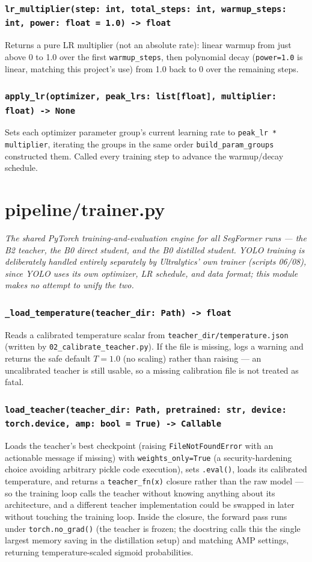 \documentclass[11pt]{article}
\newcommand{\role}[1]{\par\noindent\textit{#1}\par\vspace{0.5em}}
\newcommand{\func}[1]{\subsubsection*{\texttt{#1}}}
\begin{document}
\func{lr\_multiplier(step: int, total\_steps: int, warmup\_steps: int, power: float = 1.0) -> float}
Returns a pure LR multiplier (not an absolute rate): linear warmup from just
above 0 to 1.0 over the first \texttt{warmup\_steps}, then polynomial decay
(\texttt{power=1.0} is linear, matching this project's use) from 1.0 back to 0
over the remaining steps.

\func{apply\_lr(optimizer, peak\_lrs: list[float], multiplier: float) -> None}
Sets each optimizer parameter group's current learning rate to
\texttt{peak\_lr * multiplier}, iterating the groups in the same order
\texttt{build\_param\_groups} constructed them. Called every training step to
advance the warmup/decay schedule.

\newpage
\section{pipeline/trainer.py}
\role{The shared PyTorch training-and-evaluation engine for all SegFormer runs
--- the B2 teacher, the B0 direct student, and the B0 distilled student. YOLO
training is deliberately handled entirely separately by Ultralytics' own
trainer (scripts 06/08), since YOLO uses its own optimizer, LR schedule, and
data format; this module makes no attempt to unify the two.}

\func{\_load\_temperature(teacher\_dir: Path) -> float}
Reads a calibrated temperature scalar from \texttt{teacher\_dir/temperature.json}
(written by \texttt{02\_calibrate\_teacher.py}). If the file is missing, logs a
warning and returns the safe default $T=1.0$ (no scaling) rather than raising ---
an uncalibrated teacher is still usable, so a missing calibration file is not
treated as fatal.

\func{load\_teacher(teacher\_dir: Path, pretrained: str, device: torch.device, amp: bool = True) -> Callable}
Loads the teacher's best checkpoint (raising \texttt{FileNotFoundError} with an
actionable message if missing) with \texttt{weights\_only=True} (a
security-hardening choice avoiding arbitrary pickle code execution), sets
\texttt{.eval()}, loads its calibrated temperature, and returns a
\texttt{teacher\_fn(x)} closure rather than the raw model --- so the training
loop calls the teacher without knowing anything about its architecture, and a
different teacher implementation could be swapped in later without touching the
training loop. Inside the closure, the forward pass runs under
\texttt{torch.no\_grad()} (the teacher is frozen; the docstring calls this the
single largest memory saving in the distillation setup) and matching AMP
settings, returning temperature-scaled sigmoid probabilities.
\end{document}
